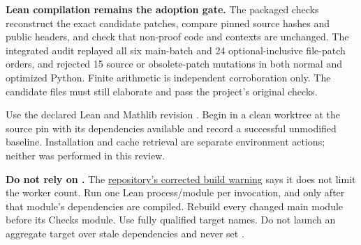 \textbf{Lean compilation remains the adoption gate.} The packaged checks reconstruct the exact candidate patches, compare pinned source hashes and public headers, and check that non-proof code and contexts are unchanged. The integrated audit replayed all six main-batch and 24 optional-inclusive file-patch orders, and rejected 15 source or obsolete-patch mutations in both normal and optimized Python. Finite arithmetic is independent corroboration only. The candidate files must still elaborate and pass the project's original checks.

Use the declared Lean  and Mathlib revision
. Begin in a clean worktree at the source pin with its dependencies available and record a successful unmodified baseline. Installation and cache retrieval are separate environment actions; neither was performed in this review.

\textbf{Do not rely on .} The
\href{https://github.com/VladimirReshetnikov/ProveIt/blob/9d9d1123b39927d30363f1dcd53c23f0575c30ee/README.md\#L248-L271}{repository's corrected build warning}
says it does not limit the worker count. Run one Lean process/module per invocation, and only after that module's dependencies are compiled. Rebuild every changed main module before its Checks module. Use fully qualified  target names. Do not launch an aggregate target over stale dependencies and never set .

